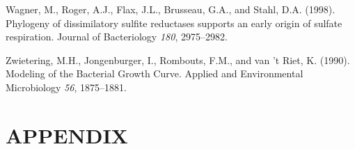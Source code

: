 \documentclass[ms, hidelinks]{uncgdissertationexp}
\theoremstyle{plain}
\theoremstyle{definition}
\theoremstyle{remark}
\begin{document}
\leavevmode\hypertarget{ref-wagnerPhylogenyDissimilatorySulfite1998}{}%
Wagner, M., Roger, A.J., Flax, J.L., Brusseau, G.A., and Stahl, D.A. (1998). Phylogeny of dissimilatory sulfite reductases supports an early origin of sulfate respiration. Journal of Bacteriology \emph{180}, 2975--2982.

\leavevmode\hypertarget{ref-zwieteringModelingBacterialGrowth1990}{}%
Zwietering, M.H., Jongenburger, I., Rombouts, F.M., and van 't Riet, K. (1990). Modeling of the Bacterial Growth Curve. Applied and Environmental Microbiology \emph{56}, 1875--1881.




\appendix
\chapter{APPENDIX}\label{app:appendix}




\end{document}
